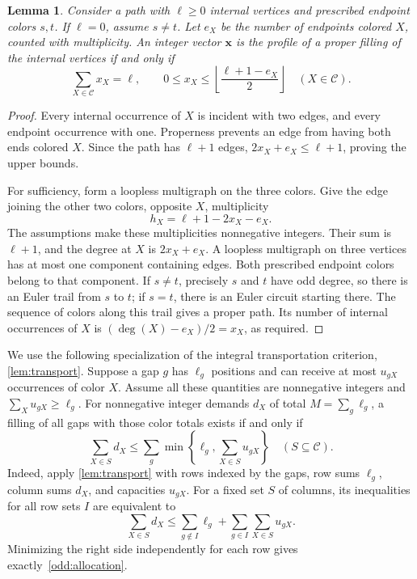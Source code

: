\documentclass[10pt,a4paper]{amsart}
\numberwithin{equation}{section}
\newtheorem{lemma}[theorem]{Lemma}
\theoremstyle{definition}
\theoremstyle{remark}
\begin{document}
\begin{lemma}\label{odd:gap}
Consider a path with $\ell\ge0$ internal vertices and prescribed endpoint
colors $s,t$. If $\ell=0$, assume $s\ne t$. Let $e_X$ be the number of
endpoints colored $X$, counted with multiplicity. An integer vector
$\mathbf x$ is the profile of a proper filling of the internal vertices
if and only if
\begin{equation}\label{odd:gapeq}
\sum_{X\in\mathcal C}x_X=\ell,
\qquad
0\le x_X\le
\left\lfloor\frac{\ell+1-e_X}{2}\right\rfloor
\quad(X\in\mathcal C).
\end{equation}
\end{lemma}
\begin{proof}
Every internal occurrence of $X$ is incident with two edges, and
every endpoint occurrence with one. Properness prevents an edge from
having both ends colored $X$. Since the path has $\ell+1$ edges,
$2x_X+e_X\le\ell+1$, proving the upper bounds.

For sufficiency, form a loopless multigraph on the three colors. Give
the edge joining the other two colors, opposite $X$, multiplicity
\[
h_X=\ell+1-2x_X-e_X.
\]
The assumptions make these multiplicities nonnegative integers.
Their sum is $\ell+1$, and the degree at $X$ is $2x_X+e_X$.
A loopless multigraph on three vertices has at most one component
containing edges. Both prescribed endpoint colors belong to that
component. If $s\ne t$, precisely $s$ and $t$ have odd degree, so
there is an Euler trail from $s$ to $t$; if $s=t$, there is an Euler
circuit starting there. The sequence of colors along this trail gives
a proper path. Its number of internal occurrences of $X$ is
$(\deg(X)-e_X)/2=x_X$, as required.
\end{proof}

We use the following specialization of the integral transportation
criterion, \cref{lem:transport}. Suppose a gap $g$ has $\ell_g$
positions and can receive at most $u_{gX}$ occurrences of color $X$.
Assume all these quantities are nonnegative integers and
$\sum_Xu_{gX}\ge\ell_g$. For nonnegative integer demands $d_X$ of total
$M=\sum_g\ell_g$, a filling of all gaps with those color totals exists
if and only if
\begin{equation}\label{odd:allocation}
\sum_{X\in S}d_X
\le\sum_g\min\left\{\ell_g,\sum_{X\in S}u_{gX}\right\}
\quad(S\subseteq\mathcal C).
\end{equation}
Indeed, apply \cref{lem:transport} with rows indexed by the gaps,
row sums $\ell_g$, column sums $d_X$, and capacities $u_{gX}$.
For a fixed set $S$ of columns, its inequalities for all row sets $I$
are equivalent to
\[
\sum_{X\in S}d_X
\le \sum_{g\notin I}\ell_g+
    \sum_{g\in I}\sum_{X\in S}u_{gX}.
\]
Minimizing the right side independently for each row gives
exactly~\eqref{odd:allocation}.
\end{document}

